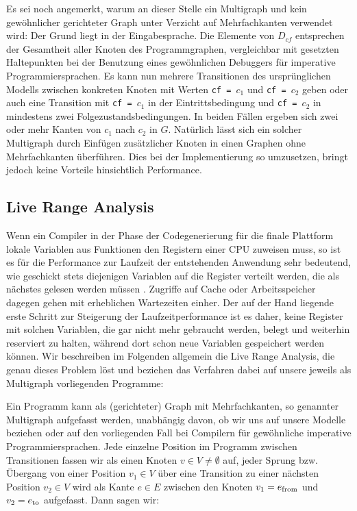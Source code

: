 \documentclass[a4paper]{article}
\theoremstyle{nonumberplain}
\begin{document}
Es sei noch angemerkt, warum an dieser Stelle ein Multigraph und kein gewöhnlicher gerichteter Graph unter Verzicht auf Mehrfachkanten verwendet wird: Der Grund liegt in der Eingabesprache. Die Elemente von $D_{cf}$ entsprechen der Gesamtheit aller Knoten des Programmgraphen, vergleichbar mit gesetzten Haltepunkten bei der Benutzung eines gewöhnlichen Debuggers für imperative Programmiersprachen. Es kann nun mehrere Transitionen des ursprünglichen Modells zwischen konkreten Knoten mit Werten \texttt{cf = }$c_1$ und \texttt{cf = }$c_2$ geben oder auch eine Transition mit \texttt{cf = }$c_1$ in der Eintrittsbedingung und \texttt{cf = }$c_2$ in mindestens zwei Folgezustandsbedingungen. In beiden Fällen ergeben sich zwei oder mehr Kanten von $c_1$ nach $c_2$ in $G$.
Natürlich lässt sich ein solcher Multigraph durch Einfügen zusätzlicher Knoten in einen Graphen ohne Mehrfachkanten überführen. Dies bei der Implementierung so umzusetzen, bringt jedoch keine Vorteile hinsichtlich Performance.

\subsection{Live Range Analysis}

Wenn ein Compiler in der Phase der Codegenerierung für die finale Plattform lokale Variablen aus Funktionen den Registern einer CPU zuweisen muss, so ist es für die Performance zur Laufzeit der entstehenden Anwendung sehr bedeutend, wie geschickt stets diejenigen Variablen auf die Register verteilt werden, die als nächstes gelesen werden müssen \cite{Krau14}. %
Zugriffe auf Cache oder Arbeitsspeicher dagegen gehen mit erheblichen Wartezeiten einher. Der auf der Hand liegende erste Schritt zur Steigerung der Laufzeitperformance ist es daher, keine Register mit solchen Variablen, die gar nicht mehr gebraucht werden, belegt und weiterhin reserviert zu halten, während dort schon neue Variablen gespeichert werden können.
Wir beschreiben im Folgenden allgemein die Live Range Analysis, die genau dieses Problem löst und beziehen das Verfahren dabei auf unsere jeweils als Multigraph vorliegenden Programme:

Ein Programm kann als (gerichteter) Graph mit Mehrfachkanten, so genannter Multigraph \mgtup{} aufgefasst werden, unabhängig davon, ob wir uns auf unsere Modelle beziehen oder auf den vorliegenden Fall bei Compilern für gewöhnliche imperative Programmiersprachen.
Jede einzelne Position im Programm zwischen Transitionen fassen wir als einen Knoten $v\in V \neq \emptyset$ auf, jeder Sprung bzw. Übergang von einer Position $v_1\in V$ über eine Transition zu einer nächsten Position $v_2 \in V$ wird als Kante $e \in E$ zwischen den Knoten $v_1 = e_{\mathrm{from}}$ und $v_2 = e_{\mathrm{to}}$ aufgefasst.
Dann sagen wir: 
\end{document}
